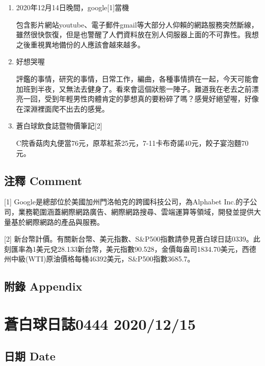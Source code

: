 \documentclass[a5paper, 11pt
]{book}
\begin{document}
\begin{enumerate}
\def\labelenumi{\arabic{enumi}.}
\item
  2020年12月14日晚間，google{[}1{]}當機

  包含影片網站youtube、電子郵件gmail等大部分人仰賴的網路服務突然斷線，雖然很快恢復，但是也警醒了人們資料放在別人伺服器上面的不可靠性。我想之後重視異地備份的人應該會越來越多。
\item
  好想哭喔

  評鑑的事情，研究的事情，日常工作，編曲，各種事情擠在一起，今天可能會加班到半夜，又無法去健身了。看來會這個狀態一陣子。難道我在老去之前漂亮一回，受到年輕男性肉體肯定的夢想真的要粉碎了嗎？感覺好絕望喔，好像在深淵裡面爬不出去的感覺。
\item
  蒼白球飲食誌暨物價筆記{[}2{]}

  C院香菇肉丸便當76元，原萃紅茶25元，7-11卡布奇諾40元，餃子宴泡麵70元。
\end{enumerate}

\hypertarget{ux6ce8ux91cb-comment-13}{%
\subsection{注釋 Comment}\label{ux6ce8ux91cb-comment-13}}

{[}1{]} Google是總部位於美國加州門洛帕克的跨國科技公司，為Alphabet
Inc.的子公司，業務範圍涵蓋網際網路廣告、網際網路搜尋、雲端運算等領域，開發並提供大量基於網際網路的產品與服務。

{[}2{]}
新台幣計價。有關新台幣、美元指數、S\&P500指數請參見蒼白球日誌0339。此刻匯率為1美元兌28.133新台幣，美元指數90.528，金價每盎司1834.70美元，西德州中級(WTI)原油價格每桶46392美元，S\&P500指數3685.7。

\hypertarget{ux9644ux9304-appendix-13}{%
\subsection{附錄 Appendix}\label{ux9644ux9304-appendix-13}}

\hypertarget{ux84bcux767dux7403ux65e5ux8a8c0444-20201215}{%
\section{蒼白球日誌0444
2020/12/15}\label{ux84bcux767dux7403ux65e5ux8a8c0444-20201215}}

\hypertarget{ux65e5ux671f-date-14}{%
\subsection{日期 Date}\label{ux65e5ux671f-date-14}}
\end{document}
